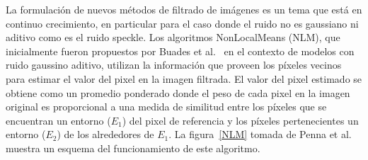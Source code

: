 \documentclass[11pt]{article}
\begin{document}



La formulación de nuevos métodos de filtrado de imágenes es un tema que está en continuo crecimiento, en particular para el caso donde el ruido no es gaussiano ni aditivo como es el ruido speckle. Los algoritmos NonLocalMeans (NLM), que inicialmente fueron propuestos por Buades et al.~\cite{Buades2005} en el contexto de modelos con ruido gaussino aditivo, utilizan la información que proveen los píxeles vecinos para estimar el valor del pixel en la imagen filtrada. El valor del pixel estimado se obtiene como un promedio ponderado donde el peso de cada pixel en la imagen original es proporcional a una medida de similitud entre los píxeles que se encuentran
un entorno ($E_1$) del pixel de referencia y los píxeles pertenecientes un entorno ($E_2$) de los alrededores de $E_1$. La figura~\ref{NLM} tomada de Penna et al.~\cite{Penna2013} muestra un esquema del funcionamiento de este algoritmo. 
\end{document}
